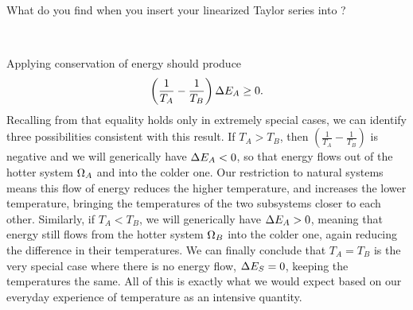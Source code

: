 What do you find when you insert your linearized Taylor series into ?
\begin{mdframed}
  \ \\[100 pt]
\end{mdframed}
Applying conservation of energy should produce
\begin{equation*}
  \left(\frac{1}{T_A} - \frac{1}{T_B}\right) \Delta E_A \geq 0.
\end{equation*}
Recalling from  that equality holds only in extremely special cases, we can identify three possibilities consistent with this result.
If $T_A > T_B$, then $\left(\frac{1}{T_A} - \frac{1}{T_B}\right)$ is negative and we will generically have $\Delta E_A < 0$, so that energy flows out of the hotter system $\Omega_A$ and into the colder one.
Our restriction to natural systems means this flow of energy reduces the higher temperature, and increases the lower temperature, bringing the temperatures of the two subsystems closer to each other.
Similarly, if $T_A < T_B$, we will generically have $\Delta E_A > 0$, meaning that energy still flows from the hotter system $\Omega_B$ into the colder one, again reducing the difference in their temperatures.
We can finally conclude that $T_A = T_B$ is the very special case where there is no energy flow, $\Delta E_S = 0$, keeping the temperatures the same.
All of this is exactly what we would expect based on our everyday experience of temperature as an intensive quantity.
